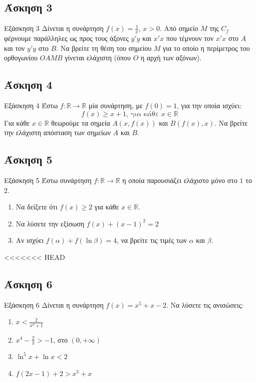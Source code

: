 \documentclass{presentation}
\begin{document}
\subsection{Άσκηση 3}
\begin{frame}[label=Άσκηση3,t]{Εξάσκηση 3}
      Δίνεται η συνάρτηση $f(x)=\frac{1}{x}$, $x>0$. Από σημείο $Μ$ της $C_f$ φέρνουμε παράλληλες ως προς τους άξονες $y'y$ και $x'x$ που τέμνουν τον $x'x$ στο $Α$ και τον $y'y$ στο $Β$. Να βρείτε τη θέση του σημείου $Μ$ για το οποίο η περίμετρος του ορθογωνίου $ΟΑΜΒ$ γίνεται ελάχιστη (όπου $Ο$ η αρχή των αξόνων).
\end{frame}

\subsection{Άσκηση 4}
\begin{frame}[label=Άσκηση4,t]{Εξάσκηση 4}
      Έστω $f:\mathbb{R}\to\mathbb{R}$ μία συνάρτηση, με $f(0)=1$, για την οποία ισχύει:
      $$f(x)\ge x+1 \text{, για κάθε } x\in\mathbb{R}$$
      Για κάθε $x\in\mathbb{R}$ θεωρούμε τα σημεία $Α(x,f(x))$ και $Β(f(x),x)$. Να βρείτε την ελάχιστη απόσταση των σημείων $Α$ και $Β$.
\end{frame}

\subsection{Άσκηση 5}
\begin{frame}[label=Άσκηση5,t]{Εξάσκηση 5}
      Έστω συνάρτηση $f:\mathbb{R}\to \mathbb{R}$ η οποία παρουσιάζει ελάχιστο μόνο στο $1$ το $2$.
      \begin{enumerate}
            \item Να δείξετε ότι $f(x)\ge 2$ για κάθε $x\in\mathbb{R}$. \pause
            \item Να λύσετε την εξίσωση $f(x)+(x-1)^2=2$ \pause
            \item Αν ισχύει $f(α)+f(\ln β)=4$, να βρείτε τις τιμές των $α$ και $β$.
      \end{enumerate}
\end{frame}

<<<<<<< HEAD
\subsection{Άσκηση 6}
\begin{frame}[label=Άσκηση6,t]{Εξάσκηση 6}
      Δίνεται η συνάρτηση $f(x)=x^5+x-2$. Να λύσετε τις ανισώσεις:
      \begin{enumerate}
            \item $x<\frac{2}{x^4+1}$ \pause
            \item $x^4-\frac{2}{x}>-1$, στο $(0,+\infty)$ \pause
            \item $\ln^5 x+\ln x<2$ \pause
            \item $f(2x-1)+2>x^5+x$
      \end{enumerate}
\end{frame}
\end{document}
